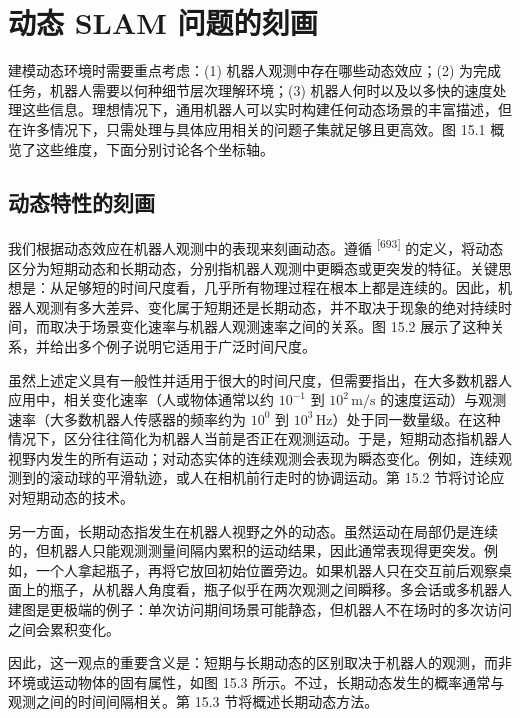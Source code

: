 \section{动态 SLAM 问题的刻画}

建模动态环境时需要重点考虑：(1) 机器人观测中存在哪些动态效应；(2) 为完成任务，机器人需要以何种细节层次理解环境；(3) 机器人何时以及以多快的速度处理这些信息。理想情况下，通用机器人可以实时构建任何动态场景的丰富描述，但在许多情况下，只需处理与具体应用相关的问题子集就足够且更高效。图 15.1 概览了这些维度，下面分别讨论各个坐标轴。

\subsection{动态特性的刻画}

我们根据动态效应在机器人观测中的表现来刻画动态。遵循 \textsuperscript{[693]} 的定义，将动态区分为短期动态和长期动态，分别指机器人观测中更瞬态或更突发的特征。关键思想是：从足够短的时间尺度看，几乎所有物理过程在根本上都是连续的。因此，机器人观测有多大差异、变化属于短期还是长期动态，并不取决于现象的绝对持续时间，而取决于场景变化速率与机器人观测速率之间的关系。图 15.2 展示了这种关系，并给出多个例子说明它适用于广泛时间尺度。

虽然上述定义具有一般性并适用于很大的时间尺度，但需要指出，在大多数机器人应用中，相关变化速率（人或物体通常以约 $10^{-1}$ 到 $10^2\,\mathrm{m/s}$ 的速度运动）与观测速率（大多数机器人传感器的频率约为 $10^0$ 到 $10^3\,\mathrm{Hz}$）处于同一数量级。在这种情况下，区分往往简化为机器人当前是否正在观测运动。于是，短期动态指机器人视野内发生的所有运动；对动态实体的连续观测会表现为瞬态变化。例如，连续观测到的滚动球的平滑轨迹，或人在相机前行走时的协调运动。第 15.2 节将讨论应对短期动态的技术。

另一方面，长期动态指发生在机器人视野之外的动态。虽然运动在局部仍是连续的，但机器人只能观测测量间隔内累积的运动结果，因此通常表现得更突发。例如，一个人拿起瓶子，再将它放回初始位置旁边。如果机器人只在交互前后观察桌面上的瓶子，从机器人角度看，瓶子似乎在两次观测之间瞬移。多会话或多机器人建图是更极端的例子：单次访问期间场景可能静态，但机器人不在场时的多次访问之间会累积变化。

因此，这一观点的重要含义是：短期与长期动态的区别取决于机器人的观测，而非环境或运动物体的固有属性，如图 15.3 所示。不过，长期动态发生的概率通常与观测之间的时间间隔相关。第 15.3 节将概述长期动态方法。

